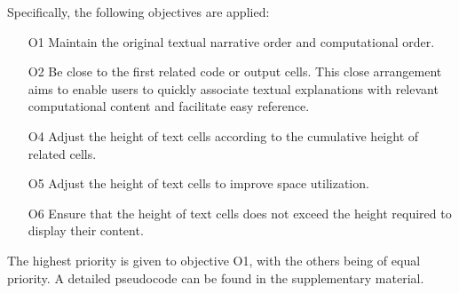 
Specifically, the following objectives are applied:
\begin{itemize}
    \item[O1] Maintain the original textual narrative order and computational order.
    \item[O2] Be close to the first related code or output cells. This close arrangement aims to enable users to quickly associate textual explanations with relevant computational content and facilitate easy reference. 
    \item[O4] Adjust the height of text cells according to the cumulative height of  related cells.  
    \item[O5] Adjust the height of text cells to improve space utilization. 
    \item[O6] Ensure that the height of text cells does not exceed the height required to display their content. 
\end{itemize}

The highest priority is given to objective O1, with the others being of equal priority. A detailed pseudocode can be found in the supplementary material.


